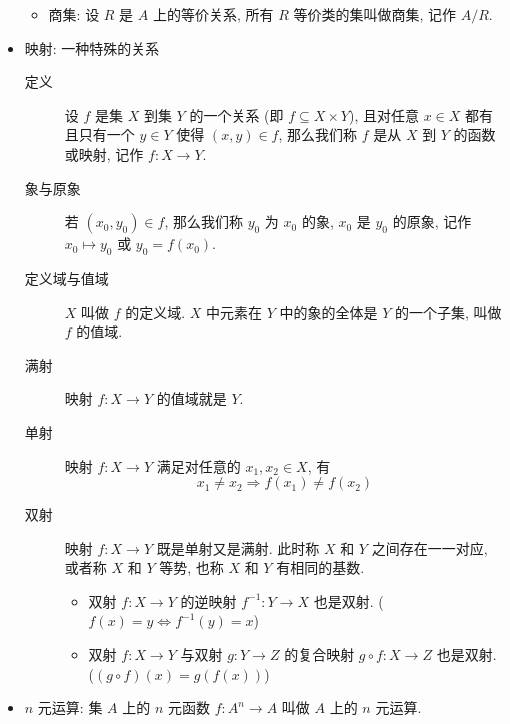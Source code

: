 \documentclass[
    color=black,
    device=normal,
    lang=cn
]{elegantnote}
\begin{document}
\begin{itemize}
\begin{itemize}
              \item 商集: 设 $R$ 是 $A$ 上的等价关系, 所有 $R$ 等价类的集叫做商集, 记作 $A/R$.
          \end{itemize}
    \item 映射: 一种特殊的关系
          \begin{description}
              \item[定义] 设 $f$ 是集 $X$ 到集 $Y$ 的一个关系 (即 $f\subseteq X\times Y$), 且对任意 $ x\in X$ 都有且只有一个 $y\in Y$ 使得 $(x,y)\in f$, 那么我们称 $f$ 是从 $X$ 到 $Y$ 的函数或映射, 记作 $f:X\to Y$.
              \item[象与原象] 若 $(x_0,y_0)\in f$, 那么我们称 $y_0$ 为 $x_0$ 的象, $x_0$ 是 $y_0$ 的原象, 记作 $x_0\mapsto y_0$ 或 $y_0=f(x_0)$.
              \item[定义域与值域] $X$ 叫做 $f$ 的定义域. $X$ 中元素在 $Y$ 中的象的全体是 $Y$ 的一个子集, 叫做 $f$ 的值域.
              \item[满射] 映射 $f:X\to Y$ 的值域就是 $Y$.
              \item[单射] 映射 $f:X\to Y$ 满足对任意的 $x_1, x_2\in X$, 有
                  $$
                      x_1\neq x_2\Rightarrow f(x_1)\neq f(x_2)
                  $$
              \item[双射] 映射 $f:X\to Y$ 既是单射又是满射. 此时称 $X$ 和 $Y$ 之间存在一一对应, 或者称 $X$ 和 $Y$ 等势, 也称 $X$ 和 $Y$ 有相同的基数.
                  \begin{itemize}
                      \item 双射 $f:X\to Y$ 的逆映射 $f^{-1}:Y\to X$ 也是双射. ($f(x)=y\Leftrightarrow f^{-1}(y) = x$)
                      \item 双射 $f:X\to Y$ 与双射 $g:Y\to Z$ 的复合映射 $g\circ f:X\to Z$ 也是双射. ($(g\circ f)(x)=g(f(x))$)
                  \end{itemize}
          \end{description}
    \item $n$ 元运算: 集 $A$ 上的 $n$ 元函数 $f:A^n\to A$ 叫做 $A$ 上的 $n$ 元运算.
\end{itemize}
\end{document}
